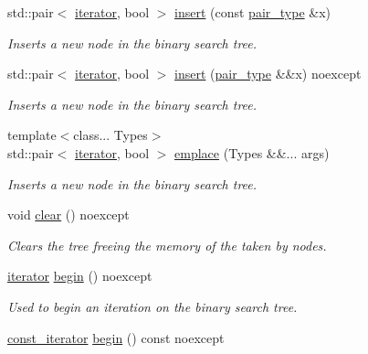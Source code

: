\begin{DoxyCompactItemize}
std\+::pair$<$ \hyperlink{classbst_a429b0445783ff6486882db5dee900ce0}{iterator}, bool $>$ \hyperlink{classbst_aaaeffdb4fae1103a3f6185c74ce43281}{insert} (const \hyperlink{classbst_a7b11cca2a3b4394915600194f741ab16}{pair\+\_\+type} \&x)
\begin{DoxyCompactList}\small\item\em Inserts a new node in the binary search tree. \end{DoxyCompactList}\item 
std\+::pair$<$ \hyperlink{classbst_a429b0445783ff6486882db5dee900ce0}{iterator}, bool $>$ \hyperlink{classbst_aafe95673b19139abd52e242e5d72b66d}{insert} (\hyperlink{classbst_a7b11cca2a3b4394915600194f741ab16}{pair\+\_\+type} \&\&x) noexcept
\begin{DoxyCompactList}\small\item\em Inserts a new node in the binary search tree. \end{DoxyCompactList}\item 
{\footnotesize template$<$class... Types$>$ }\\std\+::pair$<$ \hyperlink{classbst_a429b0445783ff6486882db5dee900ce0}{iterator}, bool $>$ \hyperlink{classbst_a03e09650b371d423315f26520d6e34a6}{emplace} (Types \&\&... args)
\begin{DoxyCompactList}\small\item\em Inserts a new node in the binary search tree. \end{DoxyCompactList}\item 
\mbox{\label{classbst_a368b8f209f5158d55374a7cdbd110962}} 
void \hyperlink{classbst_a368b8f209f5158d55374a7cdbd110962}{clear} () noexcept
\begin{DoxyCompactList}\small\item\em Clears the tree freeing the memory of the taken by nodes. \end{DoxyCompactList}\item 
\hyperlink{classbst_a429b0445783ff6486882db5dee900ce0}{iterator} \hyperlink{classbst_a74c68495fd963c501084d129d4c0f5b1}{begin} () noexcept
\begin{DoxyCompactList}\small\item\em Used to begin an iteration on the binary search tree. \end{DoxyCompactList}\item 
\hyperlink{classbst_a72485696d999bf489c6156f6327a2163}{const\+\_\+iterator} \hyperlink{classbst_a8631fb03856c2cd4602fc7446502195c}{begin} () const noexcept

\end{DoxyCompactItemize}
